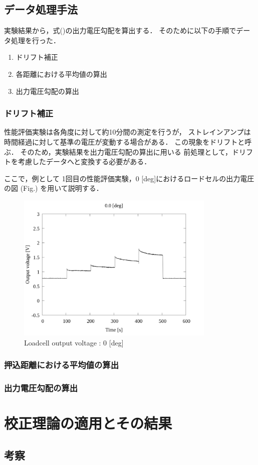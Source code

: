 \newpage

\subsection{データ処理手法}

実験結果から，式()の出力電圧勾配を算出する．
そのために以下の手順でデータ処理を行った．

\begin{enumerate}[(1)]
    \item ドリフト補正
    \item 各距離における平均値の算出
    \item 出力電圧勾配の算出
\end{enumerate}

\subsubsection{ドリフト補正}
性能評価実験は各角度に対して約10分間の測定を行うが，
ストレインアンプは時間経過に対して基準の電圧が変動する場合がある．
この現象をドリフトと呼ぶ．
そのため，実験結果を出力電圧勾配の算出に用いる
前処理として，ドリフトを考慮したデータへと変換する必要がある．

ここで，例として 1回目の性能評価実験，0 [deg]におけるロードセルの出力電圧の図 (Fig.) を用いて説明する．

\begin{figure}[htbp]
    \footnotesize
    \begin{center}
        \includegraphics[width=95mm]{../../02_workspace/result/2-1/plot/01-1_loadcell/01_loadcell_0.png}
        \caption{Loadcell output voltage : 0 [deg]}
    \end{center}
\end{figure}

\subsubsection{押込距離における平均値の算出}


\subsubsection{出力電圧勾配の算出}

\section{校正理論の適用とその結果}




\subsection{考察}